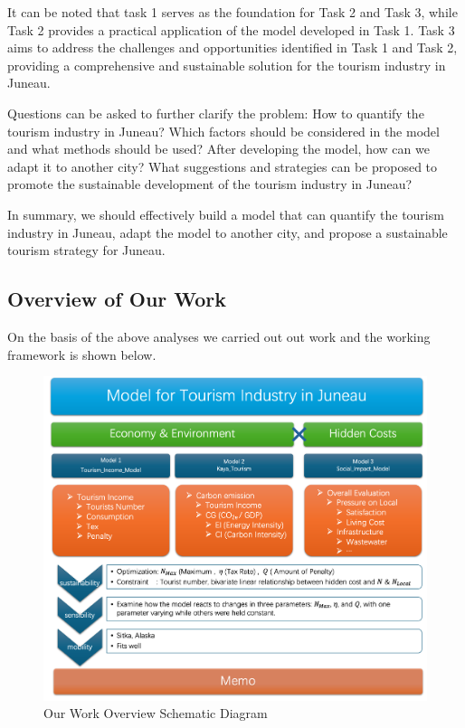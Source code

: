 It can be noted that task 1 serves as the foundation for Task 2 and Task 3, 
while Task 2 provides a practical application of the model developed in Task 1. 
Task 3 aims to address the challenges and opportunities identified in Task 1 and Task 2, 
providing a comprehensive and sustainable solution for the tourism industry in Juneau.

Questions can be asked to further clarify the problem:
How to quantify the tourism industry in Juneau? Which factors should be 
considered in the model and what methods should be used? After developing 
the model, how can we adapt it to another city? What suggestions and 
strategies can be proposed to promote the sustainable development of the
tourism industry in Juneau?

In summary, we should effectively build a model that can quantify the tourism
industry in Juneau, adapt the model to another city, and propose a sustainable
tourism strategy for Juneau.


\subsection{Overview of Our Work}

On the basis of the above analyses we carried out out work and the 
working framework is shown below.

\begin{figure}[H]
    \centering
    \includegraphics[width=1\textwidth]{FrameWork.jpg} %
    \caption{Our Work Overview Schematic Diagram}
\end{figure}

